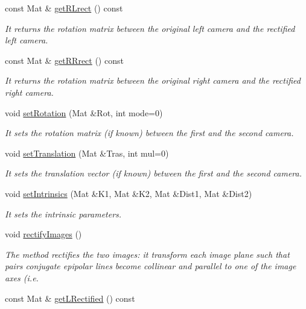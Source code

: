 \begin{DoxyCompactItemize}
const Mat \& \hyperlink{classStereoCamera_ab3adb747963c617fd2fe1a919b0c59c7}{get\+R\+Lrect} () const
\begin{DoxyCompactList}\small\item\em It returns the rotation matrix between the original left camera and the rectified left camera. \end{DoxyCompactList}\item 
const Mat \& \hyperlink{classStereoCamera_a44e111911af89a299b134fd91b4bc7d6}{get\+R\+Rrect} () const
\begin{DoxyCompactList}\small\item\em It returns the rotation matrix between the original right camera and the rectified right camera. \end{DoxyCompactList}\item 
void \hyperlink{classStereoCamera_a1329b3894d527e1505618f57a1304624}{set\+Rotation} (Mat \&Rot, int mode=0)
\begin{DoxyCompactList}\small\item\em It sets the rotation matrix (if known) between the first and the second camera. \end{DoxyCompactList}\item 
void \hyperlink{classStereoCamera_a7b10f1218e8e70f47b22080ba1820d39}{set\+Translation} (Mat \&Tras, int mul=0)
\begin{DoxyCompactList}\small\item\em It sets the translation vector (if known) between the first and the second camera. \end{DoxyCompactList}\item 
void \hyperlink{classStereoCamera_a54754623497c8dddb61f520e17f465f8}{set\+Intrinsics} (Mat \&K1, Mat \&K2, Mat \&Dist1, Mat \&Dist2)
\begin{DoxyCompactList}\small\item\em It sets the intrinsic parameters. \end{DoxyCompactList}\item 
void \hyperlink{classStereoCamera_ae5ac866c6d4b6c4819b01a918e7b61e0}{rectify\+Images} ()
\begin{DoxyCompactList}\small\item\em The method rectifies the two images\+: it transform each image plane such that pairs conjugate epipolar lines become collinear and parallel to one of the image axes (i.\+e. \end{DoxyCompactList}\item 
const Mat \& \hyperlink{classStereoCamera_ad81c9f7f4f15ef3f1e61d34fd8df9856}{get\+L\+Rectified} () const

\end{DoxyCompactItemize}
